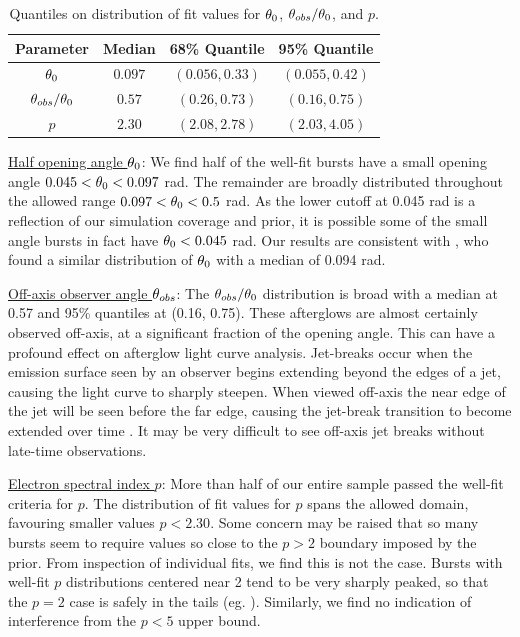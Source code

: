 \begin{table}
\begin{center}
\begin{tabular}{cccc}
\hline \hline
Parameter & Median & 68\% Quantile & 95\% Quantile \\ [0.5ex]
\hline
$\theta_0$ &  $0.097$ & $(0.056, 0.33)$ & $(0.055, 0.42)$\\
$\theta_{obs} / \theta_0$ & $0.57$ & $(0.26, 0.73)$ & $(0.16, 0.75)$ \\
$p $& $2.30$ & $(2.08, 2.78)$ & $(2.03, 4.05)$ \\
\hline
\end{tabular}
\end{center}
\caption{Quantiles on distribution of fit values for $\theta_0$, $\theta_{obs} / \theta_0$, and $p$. }
\end{table}


\underline{Half opening angle $\theta_0$}: We find half of the well-fit bursts have a small opening angle $0.045 < \theta_0 < 0.097$ rad.  The remainder are broadly distributed throughout the allowed range $0.097 < \theta_0 < 0.5$ rad.  As the lower cutoff at 0.045 rad is a reflection of our simulation coverage and prior, it is possible some of the small angle bursts in fact have $\theta_0 < 0.045$ rad.  Our results are consistent with \cite{Racusin09}, who found a similar distribution of $\theta_0$ with a median of 0.094 rad.

\underline{Off-axis observer angle $\theta_{obs}$}:  The $\theta_{obs}  / \theta_0$ distribution is broad with a median at 0.57 and 95\% quantiles at (0.16, 0.75).  These afterglows are almost certainly observed off-axis, at a significant fraction of the opening angle.  This can have a profound effect on afterglow light curve analysis.  Jet-breaks occur when the emission surface seen by an observer begins extending beyond the edges of a jet, causing the light curve to sharply steepen.  When viewed off-axis the near edge of the jet will be seen before the far edge, causing the jet-break transition to become extended over time  \citep{vanEer12obs, vanEer13boost}.  It may be very difficult to see off-axis jet breaks without late-time observations.

\underline{Electron spectral index $p$}:  More than half of our entire sample passed the well-fit criteria for $p$.  The distribution of fit values for $p$ spans the allowed domain, favouring smaller values $p < 2.30$.  Some concern may be raised that so many bursts seem to require values so close to the $p>2$ boundary imposed by the prior.  From inspection of individual fits, we find this is not the case.  Bursts with well-fit $p$ distributions centered near 2 tend to be very sharply peaked, so that the $p=2$ case is safely in the tails (eg. ).  Similarly, we find no indication of interference from the $p<5$ upper bound.  

